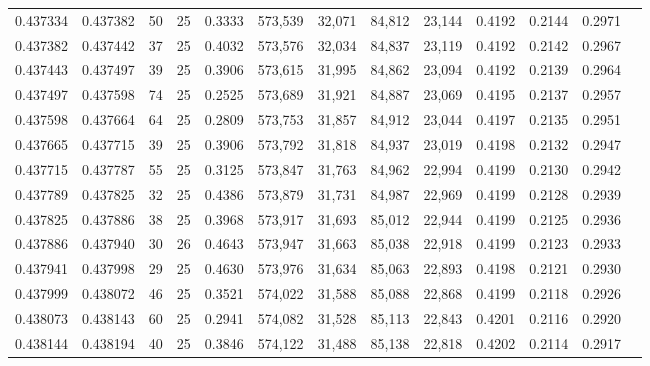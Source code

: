 \begin{tabular}{rrrrrrrrrrrrr}
0.437334 & 0.437382 &    50 &  25 &                                     0.3333 & 573,539 &  32,071 &  84,812 &  23,144 & 0.4192 & 0.2144 & 0.2971 \\
0.437382 & 0.437442 &    37 &  25 &                                     0.4032 & 573,576 &  32,034 &  84,837 &  23,119 & 0.4192 & 0.2142 & 0.2967 \\
0.437443 & 0.437497 &    39 &  25 &                                     0.3906 & 573,615 &  31,995 &  84,862 &  23,094 & 0.4192 & 0.2139 & 0.2964 \\
0.437497 & 0.437598 &    74 &  25 &                                     0.2525 & 573,689 &  31,921 &  84,887 &  23,069 & 0.4195 & 0.2137 & 0.2957 \\
0.437598 & 0.437664 &    64 &  25 &                                     0.2809 & 573,753 &  31,857 &  84,912 &  23,044 & 0.4197 & 0.2135 & 0.2951 \\
0.437665 & 0.437715 &    39 &  25 &                                     0.3906 & 573,792 &  31,818 &  84,937 &  23,019 & 0.4198 & 0.2132 & 0.2947 \\
0.437715 & 0.437787 &    55 &  25 &                                     0.3125 & 573,847 &  31,763 &  84,962 &  22,994 & 0.4199 & 0.2130 & 0.2942 \\
0.437789 & 0.437825 &    32 &  25 &                                     0.4386 & 573,879 &  31,731 &  84,987 &  22,969 & 0.4199 & 0.2128 & 0.2939 \\
0.437825 & 0.437886 &    38 &  25 &                                     0.3968 & 573,917 &  31,693 &  85,012 &  22,944 & 0.4199 & 0.2125 & 0.2936 \\
0.437886 & 0.437940 &    30 &  26 &                                     0.4643 & 573,947 &  31,663 &  85,038 &  22,918 & 0.4199 & 0.2123 & 0.2933 \\
0.437941 & 0.437998 &    29 &  25 &                                     0.4630 & 573,976 &  31,634 &  85,063 &  22,893 & 0.4198 & 0.2121 & 0.2930 \\
0.437999 & 0.438072 &    46 &  25 &                                     0.3521 & 574,022 &  31,588 &  85,088 &  22,868 & 0.4199 & 0.2118 & 0.2926 \\
0.438073 & 0.438143 &    60 &  25 &                                     0.2941 & 574,082 &  31,528 &  85,113 &  22,843 & 0.4201 & 0.2116 & 0.2920 \\
0.438144 & 0.438194 &    40 &  25 &                                     0.3846 & 574,122 &  31,488 &  85,138 &  22,818 & 0.4202 & 0.2114 & 0.2917 \\

\end{tabular}
